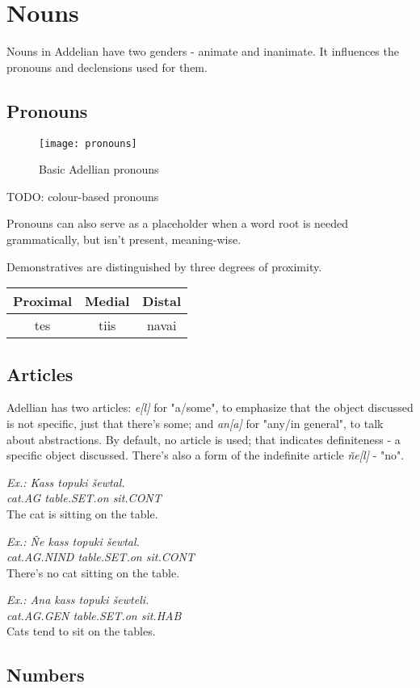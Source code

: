 \documentclass[12pt]{article}
\newcommand{\example}[3]{
	\colorbox{light-gray}{
		\parbox{5in}{
			\emph{Ex.: #1}\\
				  \emph{#2}\\
				  #3
		  }
	}
}
\newcommand{\word}[1]{
	\emph{#1}
}
\begin{document}
	\section{Nouns}

	Nouns in Addelian have two genders - animate and inanimate. It influences the pronouns and declensions used for them.
	
	\subsection{Pronouns}
	
	\begin{figure}[h]
	\centering
	\texttt{[image: pronouns]}
	\caption{Basic Adellian pronouns}
	\end{figure}

	TODO: colour-based pronouns	
	
	Pronouns can also serve as a placeholder when a word root is needed grammatically, but isn't present, meaning-wise.

	Demonstratives are distinguished by three degrees of proximity.

	\begin{tabular}{|| c | c | c ||}
		\hline
		Proximal & Medial & Distal \\
		\hline
		tes & tiis &  navai \\
		\hline
	\end{tabular}
	
	\subsection{Articles}
	
	Adellian has two articles: \word{e[l]} for "a/some", to emphasize that the object discussed is not specific, just that there's some; and \word{an[a]} for "any/in general", to talk about abstractions. By default, no article is used; that indicates definiteness - a specific object discussed.
	There's also a form of the indefinite article \word{ňe[l]} - "no".
	
	\example{Kass topuki šewtal.}
	{cat.AG table.SET.on sit.CONT}
	{The cat is sitting on the table.}
	
	\example{Ňe kass topuki šewtal.}
	{cat.AG.NIND table.SET.on sit.CONT}
	{There's no cat sitting on the table.}
	
	\example{Ana kass topuki šewteli.}
	{cat.AG.GEN table.SET.on sit.HAB}
	{Cats tend to sit on the tables.}
	
	\subsection{Numbers}
	
\end{document}
